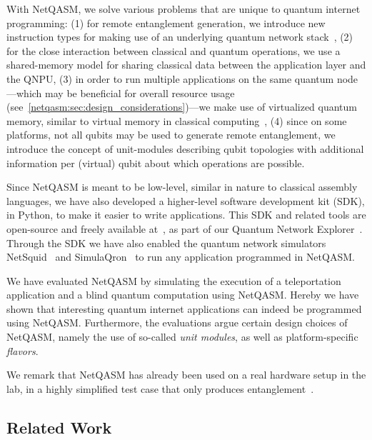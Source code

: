 With \ac{NetQASM}, we solve various problems that are unique to quantum internet programming:
    (1) for remote entanglement generation, we introduce new instruction types for making use of an underlying quantum network stack~\cite{dahlberg2019linklayer, kozlowski2020networklayer},
    (2) for the close interaction between classical and quantum operations, we use a shared-memory model for sharing classical data between the application layer and the \ac{QNPU},
    (3) in order to run multiple applications on the same quantum node---which may be beneficial for overall resource usage (see~\cref{netqasm:sec:design_considerations})---we make use of virtualized quantum memory, similar to virtual memory in classical computing~\cite{arpaci2018operating},
    (4) since on some platforms, not all qubits may be used to generate remote entanglement, we introduce the concept of unit-modules describing qubit topologies with additional information per (virtual) qubit about which operations are possible.

Since \ac{NetQASM} is meant to be low-level, similar in nature to classical assembly languages, we have also developed a higher-level software development kit (SDK), in Python, to make it easier to write applications.
This SDK and related tools are open-source and freely available at~\cite{git_netqasm}, as part of our Quantum Network Explorer~\cite{qne_website}.
Through the SDK we have also enabled the quantum network simulators NetSquid~\cite{coopmans2021netsquid} and SimulaQron~\cite{dahlberg2018simulaqron} to run any application programmed in \ac{NetQASM}.

We have evaluated \ac{NetQASM} by simulating the execution of a teleportation application and a blind quantum computation using \ac{NetQASM}.
Hereby we have shown that interesting quantum internet applications can indeed be programmed using \ac{NetQASM}.
Furthermore, the evaluations argue certain design choices of \ac{NetQASM}, namely the use of so-called \textit{unit modules}, as well as platform-specific
\textit{flavors}.

We remark that \ac{NetQASM} has already been used on a real hardware setup in the lab, in a highly simplified test case that only produces entanglement~\cite{pompili2021experimental}.


\subsection{Related Work}
\label{netqasm:sec:related}

